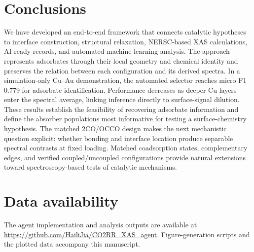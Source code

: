 \documentclass[11pt,a4paper]{article}
\newcommand{\ca}{Cu--Au}
\begin{document}
\section{Conclusions}
We have developed an end-to-end framework that connects catalytic hypotheses to interface construction, structural relaxation, NERSC-based XAS calculations, AI-ready records, and automated machine-learning analysis. The approach represents adsorbates through their local geometry and chemical identity and preserves the relation between each configuration and its derived spectra. In a simulation-only \ca{} demonstration, the automated selector reaches micro F1 0.779 for adsorbate identification. Performance decreases as deeper Cu layers enter the spectral average, linking inference directly to surface-signal dilution. These results establish the feasibility of recovering adsorbate information and define the absorber populations most informative for testing a surface-chemistry hypothesis. The matched 2CO/OCCO design makes the next mechanistic question explicit: whether bonding and interface location produce separable spectral contrasts at fixed loading. Matched coadsorption states, complementary edges, and verified coupled/uncoupled configurations provide natural extensions toward spectroscopy-based tests of catalytic mechanisms.

\section*{Data availability}
The agent implementation and analysis outputs are available at \url{https://github.com/HailiJia/CO2RR_XAS_agent}. Figure-generation scripts and the plotted data accompany this manuscript.


\end{document}
